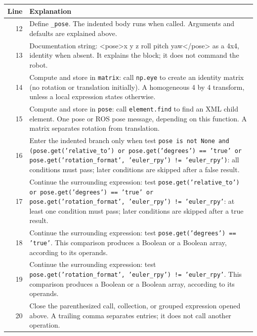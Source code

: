 \documentclass[11pt,a4paper]{book}
\begin{document}
\begin{longtable}{r p{}}

\textbf{Line} & \textbf{Explanation} \\ \hline \endhead

12 & Define \texttt{\_pose}. The indented body runs when called. Arguments and defaults are explained above. \\

13 & Documentation string: <pose>x y z roll pitch yaw</pose> as a 4x4, identity when absent. It explains the block; it does not command the robot. \\

14 & Compute and store in \texttt{matrix}: call \texttt{np.eye} to create an identity matrix (no rotation or translation initially). A homogeneous 4 by 4 transform, unless a local expression states otherwise. \\

15 & Compute and store in \texttt{pose}: call \texttt{element.find} to find an XML child element. One pose or ROS pose message, depending on this function. A matrix separates rotation from translation. \\

16 & Enter the indented branch only when test \texttt{pose is not None and (pose.get('relative\_to') or pose.get('degrees') == 'true' or pose.get('rotation\_format', 'euler\_rpy') != 'euler\_rpy')}: all conditions must pass; later conditions are skipped after a false result. \\

17 & Continue the surrounding expression: test \texttt{pose.get('relative\_to') or pose.get('degrees') == 'true' or pose.get('rotation\_format', 'euler\_rpy') != 'euler\_rpy'}: at least one condition must pass; later conditions are skipped after a true result. \\

18 & Continue the surrounding expression: test \texttt{pose.get('degrees') == 'true'}. This comparison produces a Boolean or a Boolean array, according to its operands. \\

19 & Continue the surrounding expression: test \texttt{pose.get('rotation\_format', 'euler\_rpy') != 'euler\_rpy'}. This comparison produces a Boolean or a Boolean array, according to its operands. \\

20 & Close the parenthesized call, collection, or grouped expression opened above. A trailing comma separates entries; it does not call another operation. \\


\end{longtable}
\end{document}
